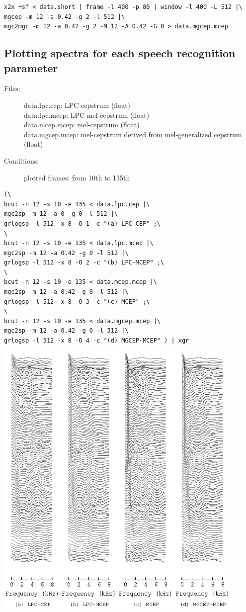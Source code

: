 \documentclass[a4paper]{article}
\begin{document}
\begin{verbatim}
x2x +sf < data.short | frame -l 400 -p 80 | window -l 400 -L 512 |\
mgcep -m 12 -a 0.42 -g 2 -l 512 |\
mgc2mgc -m 12 -a 0.42 -g 2 -M 12 -A 0.42 -G 0 > data.mgcep.mcep
\end{verbatim}

\subsection{Plotting spectra for each speech recognition parameter}

\begin{description}
\item[Files:]
  data.lpc.cep: LPC cepstrum (float)\\
  data.lpc.mcep: LPC mel-cepstrum (float)\\
  data.mcep.mcep: mel-cepstrum  (float)\\
  data.mgcep.mcep: mel-cepstrum derived from mel-generalized cepstrum (float)
\item[Conditions:]
  plotted frames: from 10th to 135th\\
\end{description}

\begin{verbatim}
(\
bcut -n 12 -s 10 -e 135 < data.lpc.cep |\
mgc2sp -m 12 -a 0 -g 0 -l 512 |\
grlogsp -l 512 -x 8 -O 1 -c "(a) LPC-CEP" ;\
\
bcut -n 12 -s 10 -e 135 < data.lpc.mcep |\
mgc2sp -m 12 -a 0.42 -g 0 -l 512 |\
grlogsp -l 512 -x 8 -O 2 -c "(b) LPC-MCEP" ;\
\
bcut -n 12 -s 10 -e 135 < data.mcep.mcep |\
mgc2sp -m 12 -a 0.42 -g 0 -l 512 |\
grlogsp -l 512 -x 8 -O 3 -c "(c) MCEP" ;\
\
bcut -n 12 -s 10 -e 135 < data.mgcep.mcep |\
mgc2sp -m 12 -a 0.42 -g 0 -l 512 |\
grlogsp -l 512 -x 8 -O 4 -c "(d) MGCEP-MCEP" ) | xgr
\end{verbatim}

\includegraphics[width=12cm]{data.all.mcep.grlogsp.eps}
\end{document}

